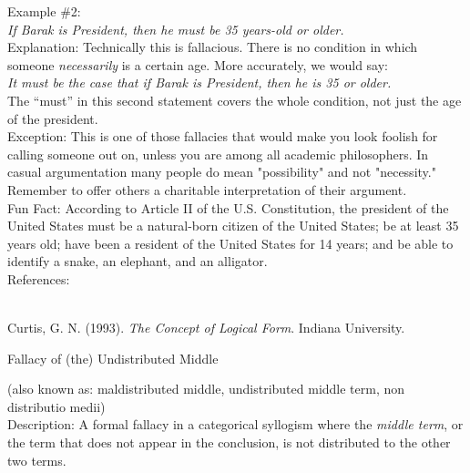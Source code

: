 \documentclass[a4paper,12pt,single,pdftex]{scrartcl}
\begin{document}
    
      Example \#2:
    \\

    
      {\em If Barak is President, then he must be 35 years-old or older.}
    \\

    
      Explanation: Technically this is fallacious.  There is no condition in which someone {\it necessarily} is a certain age.  More accurately, we would say:
    \\

    
      {\em It must be the case that if Barak is President, then he is 35 or older.}
    \\

    
      The “must” in this second statement covers the whole condition, not just the age of the president.
    \\

    
      Exception: This is one of those fallacies that would make you look foolish for calling someone out on, unless you are among all academic philosophers. In casual argumentation many people do mean "possibility" and not "necessity." Remember to offer others a charitable interpretation of their argument.
    \\

    
      Fun Fact: According to Article II of the U.S. Constitution, the president of the United States must be a natural-born citizen of the United States; be at least 35 years old; have been a resident of the United States for 14 years; and be able to identify a snake, an elephant, and an alligator.
    \\

    References:

    
      
        
      \\

      
        
          Curtis, G. N. (1993). {\it The Concept of Logical Form}. Indiana University.
        
      
    
  

Fallacy of (the) Undistributed Middle
    
      (also known as: maldistributed middle, undistributed middle term, non distributio medii)
    \\

  
    Description: A formal fallacy in a categorical syllogism where the {\it middle term}, or the term that does not appear in the conclusion, is not distributed to the other two terms.
\end{document}
